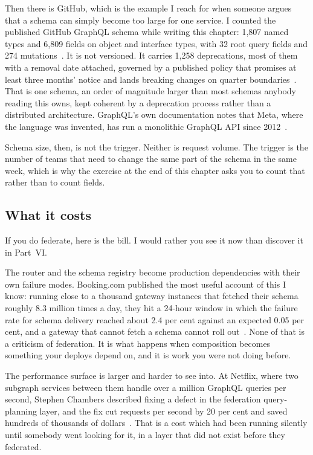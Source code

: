 %
Then there is GitHub, which is the example I reach for when someone argues that
a schema can simply become too large for one service. I counted the published
GitHub GraphQL schema while writing this chapter: 1,807 named types and 6,809
fields on object and interface types, with 32 root query fields and 274
mutations~\autocite{github2026schema}. It is not versioned. It carries 1,258
deprecations, most of them with a removal date attached, governed by a published
policy that promises at least three months' notice and lands breaking changes on
quarter boundaries~\autocite{github2026breaking}. That is one schema, an order
of magnitude larger than most schemas anybody reading this owns, kept coherent
by a deprecation process rather than a distributed architecture. GraphQL's own
documentation notes that Meta, where the language was invented, has run a
monolithic GraphQL API since 2012~\autocite{graphqlorg2026federation}.

Schema size, then, is not the trigger. Neither is request volume. The trigger is
the number of teams that need to change the same part of the schema in the same
week, which is why the exercise at the end of this chapter asks you to count
that rather than to count fields.

\subsection*{What it costs}

If you do federate, here is the bill. I would rather you see it now than
discover it in Part~VI.

The router and the schema registry become production dependencies with their own
failure modes. Booking.com published the most useful account of this I know:
running close to a thousand gateway instances that fetched their schema roughly
8.3 million times a day, they hit a 24-hour window in which the failure rate for
schema delivery reached about 2.4 per cent against an expected 0.05 per cent,
and a gateway that cannot fetch a schema cannot roll
out~\autocite{ernst2022booking}. None of that is a criticism of federation. It
is what happens when composition becomes something your deploys depend on, and
it is work you were not doing before.

The performance surface is larger and harder to see into. At Netflix, where two
subgraph services between them handle over a million GraphQL queries per second,
Stephen Chambers described fixing a defect in the federation query-planning
layer, and the fix cut requests per second by 20 per cent and saved hundreds of
thousands of dollars~\autocite{chambers2026netflix}. That is a cost which had
been running silently until somebody went looking for it, in a layer that did
not exist before they federated.

